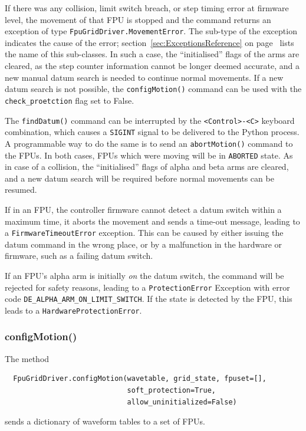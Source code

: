 \documentclass[11pt,a4paper]{scrartcl}
\begin{document}
\begin{sloppypar}
If there was any collision, limit switch breach, or step timing error
at firmware level, the movement of that FPU is stopped and the command
returns an exception of type \texttt{FpuGridDriver.MovementError}. The
sub-type of the exception indicates the cause of the error;
section~\ref{sec:ExceptionsReference} on
page~\pageref{sec:ExceptionsReference} lists the name of this
sub-classes. In such a case, the ``initialised'' flags of the arms
are cleared, as the step counter information cannot be longer deemed
accurate, and a new manual datum search is needed to continue normal
movements. If a new datum search is not possible, the
\texttt{configMotion()} command can be used with the
\texttt{check\_proetction} flag set to False.
\end{sloppypar}


The \texttt{findDatum()} command can be interrupted by the
\texttt{<Control>-<C>} keyboard combination, which causes a
\texttt{SIGINT} signal to be delivered to the Python process. A
programmable way to do the same is to send an \texttt{abortMotion()}
command to the FPUs.  In both cases, FPUs which were moving will be in
\texttt{ABORTED} state. As in case of a collision, the ``initialised''
flags of alpha and beta arms are cleared, and a new datum search will
be required before normal movements can be resumed.

If in an FPU, the controller firmware cannot detect a datum switch
within a maximum time, it aborts the movement and sends a time-out
message, leading to a \texttt{FirmwareTimeoutError} exception. This
can be caused by either issuing the datum command in the wrong place,
or by a malfunction in the hardware or firmware, such as a failing
datum switch.

If an FPU's alpha arm is initially \emph{on} the datum switch, the
command will be rejected for safety reasons, leading to a
\texttt{ProtectionError} Exception with error code
\verb+DE_ALPHA_ARM_ON_LIMIT_SWITCH+. If the state
is detected by the FPU, this leads to a \texttt{HardwareProtectionError}.





\subsubsection{configMotion()}
\label{sec:configmotion}

The method
\begin{verbatim}
  FpuGridDriver.configMotion(wavetable, grid_state, fpuset=[],
                             soft_protection=True,
                             allow_uninitialized=False)
\end{verbatim}
sends a dictionary of waveform tables to a set of FPUs.
\end{document}
